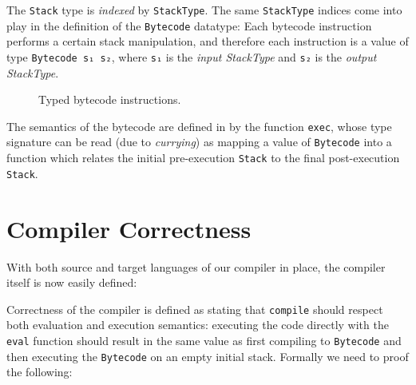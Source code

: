 \documentclass[a4paper]{article}
\begin{document}
        The \texttt{Stack} type is \emph{indexed} by \texttt{StackType}.
        The same \texttt{StackType} indices come into play in the definition of the \texttt{Bytecode} datatype:
        Each bytecode instruction performs a certain stack manipulation,
        and therefore each instruction is a value of type \texttt{Bytecode s₁ s₂},
        where \texttt{s₁} is the \emph{input StackType} and \texttt{s₂} is the \emph{output StackType}.

        \begin{figure}[h!]
            \caption{Typed bytecode instructions.
                \label{lst:bytecode}
            }
        \end{figure}

        The semantics of the bytecode are defined in by the function \texttt{exec}, whose type 
        signature can be read (due to \emph{currying}) as mapping a value of \texttt{Bytecode}
        into a function which relates the initial pre-execution \texttt{Stack} to the final post-execution \texttt{Stack}.


        
    \section{Compiler Correctness}
    \label{sec:correctness}
        With both source and target languages of our compiler in place, the compiler itself is now easily defined:


        Correctness of the compiler is defined as stating that \texttt{compile} should respect both evaluation and execution semantics: executing
        the code directly with the \texttt{eval} function should result in the same value as first compiling to \texttt{Bytecode} and
        then executing the \texttt{Bytecode} on an empty initial stack. Formally we need to proof the following:
        
\end{document}
